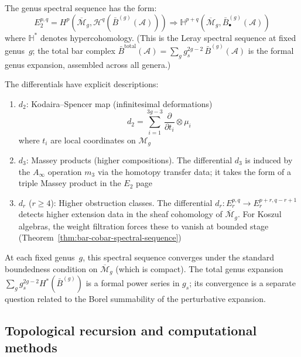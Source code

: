\begin{spectralsequence}\label{ss:genus}
The genus spectral sequence has the form:
\[E_2^{p,q} = H^p(\overline{\mathcal{M}}_g, \mathcal{H}^q(\bar{B}^{(g)}(\mathcal{A}))) \Rightarrow \mathbb{H}^{p+q}(\overline{\mathcal{M}}_g, \bar{B}^{(g)}_\bullet(\mathcal{A}))\]
where $\mathbb{H}^*$ denotes hypercohomology.
(This is the Leray spectral sequence at fixed genus~$g$; the total bar complex $\bar{B}^{\mathrm{total}}(\mathcal{A}) = \sum_g g_s^{2g-2}\, \bar{B}^{(g)}(\mathcal{A})$ is the formal genus expansion, assembled across all genera.)

The differentials have explicit descriptions:
\begin{enumerate}
\item $d_2$: Kodaira--Spencer map (infinitesimal deformations)
\[d_2 = \sum_{i=1}^{3g-3} \frac{\partial}{\partial t_i} \otimes \mu_i\]
where $t_i$ are local coordinates on $\mathcal{M}_g$

\item $d_3$: Massey products (higher compositions).
The differential $d_3$ is induced by the $A_\infty$ operation $m_3$ via the homotopy
transfer data; it takes the form of a triple Massey product in the $E_2$ page

\item $d_r$ ($r \geq 4$): Higher obstruction classes.  The differential $d_r\colon E_r^{p,q} \to E_r^{p+r,q-r+1}$ detects higher extension data in the sheaf cohomology of $\overline{\mathcal{M}}_g$.  For Koszul algebras, the weight filtration forces these to vanish at bounded stage (Theorem~\ref{thm:bar-cobar-spectral-sequence})
\end{enumerate}

At each fixed genus~$g$, this spectral sequence converges under the standard boundedness condition on $\overline{\mathcal{M}}_g$ (which is compact).  The total genus expansion $\sum_g g_s^{2g-2} H^*(\bar{B}^{(g)})$ is a formal power series in $g_s$; its convergence is a separate question related to the Borel summability of the perturbative expansion.
\end{spectralsequence}


\subsection{Topological recursion and computational methods}\label{subsec:recursion}

